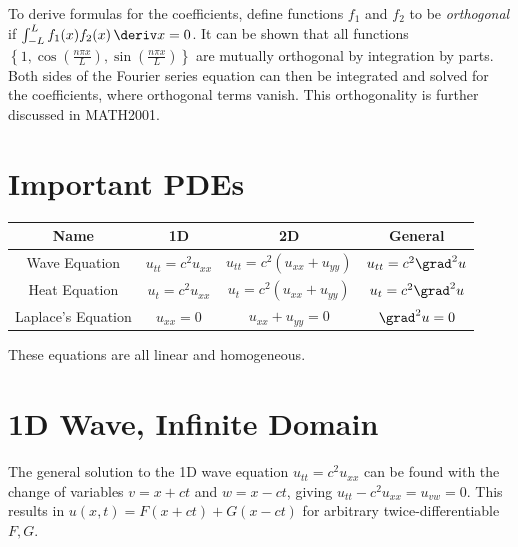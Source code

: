 \documentclass[10pt, a4paper]{article}
\begin{document}
\begin{landscape}
\begin{multicols}{2}
    To derive formulas for the coefficients, define functions \(f_1\) and \(f_2\) to be \emph{orthogonal}
    if \(\int_{-L}^{L} f_1(x) f_2(x) \,\deriv x = 0\). It can be shown that all functions
    \(\left\{1, \cos\left(\frac{n \pi x}{L}\right), \sin\left(\frac{n \pi x}{L}\right)\right\}\)
    are mutually orthogonal by integration by parts.
    Both sides of the Fourier series equation can then be integrated and solved for
    the coefficients, where orthogonal terms vanish. This orthogonality is further discussed in MATH2001.

\end{multicols}

\pagebreak

\begin{multicols*}{2}

    \section{Important PDEs}

    {
    \everymath{\displaystyle}
    \begin{center}
    \begin{tabular}{cccc}
        \toprule
        Name & 1D & 2D & General \\
        \midrule
        Wave Equation & \(u_{tt} = c^2 u_{xx}\) & \(u_{tt} = c^2 (u_{xx} + u_{yy})\) & \(u_{tt} = c^2 \grad^2 u\) \\
        Heat Equation & \(u_t = c^2 u_{xx}\) & \(u_{t} = c^2 (u_{xx} + u_{yy})\) & \(u_{t} = c^2 \grad^2 u\) \\
        Laplace's Equation & \(u_{xx} = 0\) & \(u_{xx} + u_{yy} = 0\) & \(\grad^2 u = 0\) \\
        \bottomrule
    \end{tabular}
    \end{center}
    }

    These equations are all linear and homogeneous.

    \section{1D Wave, Infinite Domain}

    The general solution to the 1D wave equation \(u_{tt} = c^2 u_{xx}\) can be found with the change of
    variables \(v = x + ct\) and \(w = x - ct\), giving \(u_{tt} - c^2 u_{xx} = u_{vw} = 0\).
    This results in \(u(x, t) = F(x + ct) + G(x - ct)\) for arbitrary twice-differentiable \(F, G\).


\end{multicols*}
\end{landscape}
\end{document}
